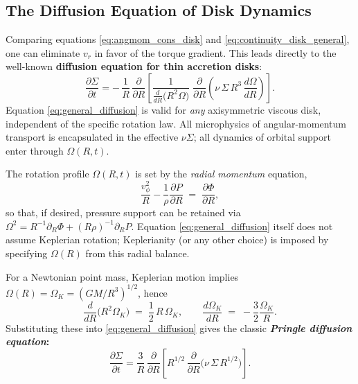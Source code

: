 \subsection*{The Diffusion Equation of Disk Dynamics}
Comparing equations \eqref{eq:angmom_cons_disk} and \eqref{eq:continuity_disk_general}, one can eliminate $v_r$ in favor of the torque gradient.  This leads directly to the well-known \textbf{diffusion equation for thin accretion disks}:
\begin{equation}
\boxed{\;
\frac{\partial \Sigma}{\partial t}
= -\,\frac{1}{R}\,\frac{\partial}{\partial R}
\left[
\frac{1}{\displaystyle \frac{d}{dR}\!\big(R^2\Omega\big)}
\;\frac{\partial}{\partial R}\!\left(\nu\,\Sigma\,R^3\,\frac{d\Omega}{dR}\right)
\right].
\;}
\label{eq:general_diffusion}
\end{equation}
Equation \eqref{eq:general_diffusion} is valid for \emph{any} axisymmetric viscous disk, independent of the specific rotation law.  
All microphysics of angular-momentum transport is encapsulated in the effective $\nu\Sigma$; 
all dynamics of orbital support enter through $\Omega(R,t)$.

\begin{remark}
The rotation profile $\Omega(R,t)$ is set by the \emph{radial momentum} equation,
\[
\frac{v_\phi^2}{R} - \frac{1}{\rho}\frac{\partial P}{\partial R} \;=\; \frac{\partial \Phi}{\partial R},
\]
so that, if desired, pressure support can be retained via
$\Omega^2 = R^{-1}\partial_R\Phi + (R\rho)^{-1}\partial_R P$.
Equation \eqref{eq:general_diffusion} itself does not assume Keplerian rotation;  
Keplerianity (or any other choice) is imposed by specifying $\Omega(R)$ from this radial balance.
\end{remark}

For a Newtonian point mass, Keplerian motion implies $\Omega(R)=\Omega_K=(GM/R^3)^{1/2}$, hence
\[
\frac{d}{dR}\!\big(R^2\Omega_K\big) \;=\; \frac{1}{2}\,R\,\Omega_K,
\qquad
\frac{d\Omega_K}{dR} \;=\; -\frac{3}{2}\frac{\Omega_K}{R}.
\]
Substituting these into \eqref{eq:general_diffusion} gives the classic \textbf{\emph{Pringle diffusion equation}:}
\begin{equation}
\boxed{\;
\frac{\partial \Sigma}{\partial t}
= \frac{3}{R}\,\frac{\partial}{\partial R}
\left[
R^{1/2}\,\frac{\partial}{\partial R}\!\big(\nu\,\Sigma\,R^{1/2}\big)
\right].
\;}
\label{eq:Pringle}
\end{equation}

